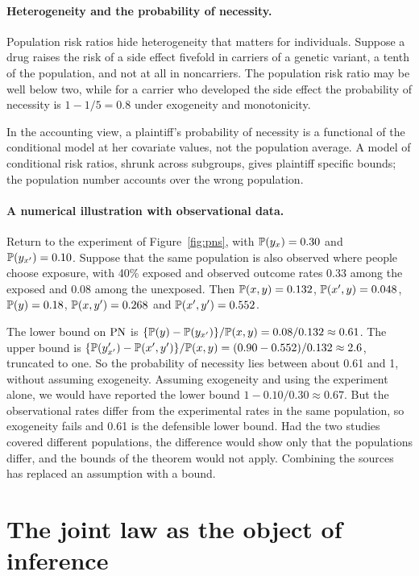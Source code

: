\paragraph{Heterogeneity and the probability of necessity.} Population risk ratios hide heterogeneity that matters for individuals. Suppose a drug raises the risk of a side effect fivefold in carriers of a genetic variant, a tenth of the population, and not at all in noncarriers. The population risk ratio may be well below two, while for a carrier who developed the side effect the probability of necessity is $1 - 1/5 = 0.8$ under exogeneity and monotonicity.

In the accounting view, a plaintiff's probability of necessity is a functional of the conditional model at her covariate values, not the population average. A model of conditional risk ratios, shrunk across subgroups, gives plaintiff specific bounds; the population number accounts over the wrong population.

\paragraph{A numerical illustration with observational data.} Return to the experiment of Figure~\ref{fig:pns}, with $\mathbb{P}(y_x) = 0.30$ and $\mathbb{P}(y_{x'}) = 0.10$. Suppose that the same population is also observed where people choose exposure, with 40\% exposed and observed outcome rates 0.33 among the exposed and 0.08 among the unexposed. Then $\mathbb{P}(x, y) = 0.132$, $\mathbb{P}(x', y) = 0.048$, $\mathbb{P}(y) = 0.18$, $\mathbb{P}(x, y') = 0.268$ and $\mathbb{P}(x', y') = 0.552$.

The lower bound on $\mathrm{PN}$ is $\{\mathbb{P}(y) - \mathbb{P}(y_{x'})\}/\mathbb{P}(x, y) = 0.08/0.132 \approx 0.61$. The upper bound is $\{\mathbb{P}(y'_{x'}) - \mathbb{P}(x', y')\}/\mathbb{P}(x, y) = (0.90 - 0.552)/0.132 \approx 2.6$, truncated to one. So the probability of necessity lies between about 0.61 and 1, without assuming exogeneity. Assuming exogeneity and using the experiment alone, we would have reported the lower bound $1 - 0.10/0.30 \approx 0.67$. But the observational rates differ from the experimental rates in the same population, so exogeneity fails and 0.61 is the defensible lower bound. Had the two studies covered different populations, the difference would show only that the populations differ, and the bounds of the theorem would not apply. Combining the sources has replaced an assumption with a bound.

\section{The joint law as the object of inference}

